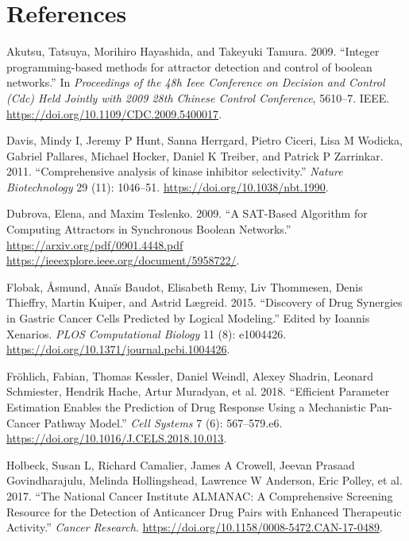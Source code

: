 \documentclass[12pt,]{book}
\begin{document}
\hypertarget{references}{%
\chapter*{References}\label{references}}

\hypertarget{refs}{}
\leavevmode\hypertarget{ref-Akutsu2009}{}%
Akutsu, Tatsuya, Morihiro Hayashida, and Takeyuki Tamura. 2009. ``Integer programming-based methods for attractor detection and control of boolean networks.'' In \emph{Proceedings of the 48h Ieee Conference on Decision and Control (Cdc) Held Jointly with 2009 28th Chinese Control Conference}, 5610--7. IEEE. \url{https://doi.org/10.1109/CDC.2009.5400017}.

\leavevmode\hypertarget{ref-Davis2011}{}%
Davis, Mindy I, Jeremy P Hunt, Sanna Herrgard, Pietro Ciceri, Lisa M Wodicka, Gabriel Pallares, Michael Hocker, Daniel K Treiber, and Patrick P Zarrinkar. 2011. ``Comprehensive analysis of kinase inhibitor selectivity.'' \emph{Nature Biotechnology} 29 (11): 1046--51. \url{https://doi.org/10.1038/nbt.1990}.

\leavevmode\hypertarget{ref-Dubrova2009}{}%
Dubrova, Elena, and Maxim Teslenko. 2009. ``A SAT-Based Algorithm for Computing Attractors in Synchronous Boolean Networks.'' \href{https://arxiv.org/pdf/0901.4448.pdf\%20https://ieeexplore.ieee.org/document/5958722/}{https://arxiv.org/pdf/0901.4448.pdf https://ieeexplore.ieee.org/document/5958722/}.

\leavevmode\hypertarget{ref-Flobak2015}{}%
Flobak, Åsmund, Anaïs Baudot, Elisabeth Remy, Liv Thommesen, Denis Thieffry, Martin Kuiper, and Astrid Lægreid. 2015. ``Discovery of Drug Synergies in Gastric Cancer Cells Predicted by Logical Modeling.'' Edited by Ioannis Xenarios. \emph{PLOS Computational Biology} 11 (8): e1004426. \url{https://doi.org/10.1371/journal.pcbi.1004426}.

\leavevmode\hypertarget{ref-Frohlich2018}{}%
Fröhlich, Fabian, Thomas Kessler, Daniel Weindl, Alexey Shadrin, Leonard Schmiester, Hendrik Hache, Artur Muradyan, et al. 2018. ``Efficient Parameter Estimation Enables the Prediction of Drug Response Using a Mechanistic Pan-Cancer Pathway Model.'' \emph{Cell Systems} 7 (6): 567--579.e6. \url{https://doi.org/10.1016/J.CELS.2018.10.013}.

\leavevmode\hypertarget{ref-Holbeck2017}{}%
Holbeck, Susan L, Richard Camalier, James A Crowell, Jeevan Prasaad Govindharajulu, Melinda Hollingshead, Lawrence W Anderson, Eric Polley, et al. 2017. ``The National Cancer Institute ALMANAC: A Comprehensive Screening Resource for the Detection of Anticancer Drug Pairs with Enhanced Therapeutic Activity.'' \emph{Cancer Research}. \url{https://doi.org/10.1158/0008-5472.CAN-17-0489}.
\end{document}
